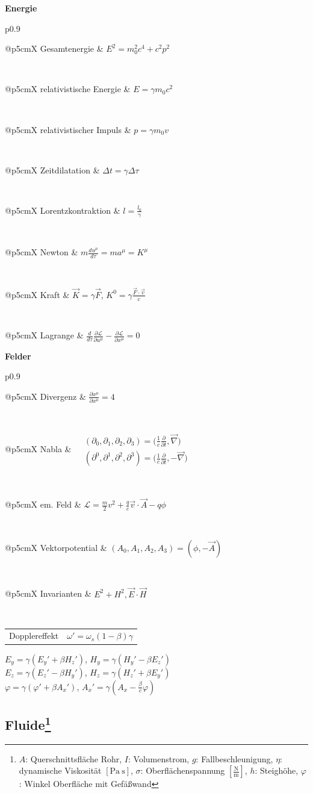 \documentclass[12pt,a4paper, twoside]{article}
\makeatletter
\renewcommand{\d}[2]{\frac{d #1}{d #2}}
\newcommand{\pd}[2]{\frac{\partial #1}{\partial #2}}
\renewcommand{\=}[1]{\stackrel{#1}{=}}
\theoremstyle{definition}
\theoremstyle{remark}
\newcommand{\concept}[2]{%
\noindent
\begin{framed}
\noindent\textbf{#1}
\par\begin{tabular}{p{0.9\linewidth}}
#2
\end{tabular}
\end{framed}
}
\newcommand{\f}[2]{%
\noindent\begin{tabularx}{\linewidth}{@{}p{5cm}X}
#1 & $#2$
\end{tabularx}}
\makeatother
\begin{document}
\concept{Energie}{

\f{Gesamtenergie}{E^2 = m_0^2 c^4 + c^2p^2}\\
\f{relativistische Energie}{E = \gamma m_0 c^2}\\
\f{relativistischer Impuls}{p = \gamma m_0 v}\\
\f{Zeitdilatation}{\Delta t = \gamma \Delta \tau}\\
\f{Lorentzkontraktion}{l = \frac{l_0}{\gamma}}\\
\f{Newton}{m \d{u^{\mu}}{\tau} = ma^{\mu} = K^{\mu}}\\
\f{Kraft}{\vec{K} = \gamma \vec{F}$, $K^0 = \gamma \frac{\vec{F} \cdot \vec{v}}{c}}\\
\f{Lagrange}{\d{}{\tau} \pd{\mathscr{L}}{u^{\mu}} - \pd{\mathscr{L}}{x^{\mu}} = 0}
}

\concept{Felder}{

\f{Divergenz}{\pd{x^{\mu}}{x^{\mu}} = 4}\\
\f{Nabla}{\begin{aligned} &(\partial_0, \partial_1, \partial_2, \partial_3) = \Big(\frac{1}{c} \pd{}{t}, \vec{\nabla}\Big)\\
&(\partial^0, \partial^1, \partial^2, \partial^3) = \Big(\frac{1}{c} \pd{}{t}, -\vec{\nabla}\Big)\end{aligned}}\\
\f{em. Feld}{\mathscr{L} = \frac{m}{2} v^2 + \frac{q}{c} \vec{v} \cdot \vec{A} - q \phi}\\
\f{Vektorpotential}{(A_0, A_1, A_2, A_3) = (\phi, - \vec{A})}\\
\f{Invarianten}{E^2 + H^2, \vec E \cdot \vec H}\\
\f{Dopplereffekt}{\omega' = \omega_s (1-\beta)\gamma}

}

\begin{center}
\begin{framed}

$E_y = \gamma (E_y' + \beta H_z')$, $H_y = \gamma (H_y' - \beta E_z')$\\
$E_z = \gamma (E_z' - \beta H_y')$, $H_z = \gamma (H_z' + \beta E_y')$\\
$\varphi = \gamma(\varphi' + \beta A_x')$, $A_x' = \gamma(A_x - \frac{\beta}{c} \varphi)$

\end{framed}
\end{center}

\subsection[Fluide]{Fluide\let\thefootnote\relax\footnote{$A$: Querschnittsfläche Rohr, $I$: Volumenstrom, $g$: Fallbeschleunigung, $\eta$: dynamische Viskosität $[\text{Pa}~\text{s}]$, $\sigma$: Oberflächenspannung $[\frac{\text{N}}{\text{m}}]$, $h$: Steighöhe, $\varphi$: Winkel Oberfläche mit Gefäßwand}}
\end{document}
